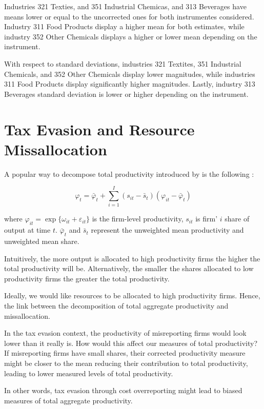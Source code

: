 \documentclass[
  12pt]{article}
\theoremstyle{definition}
\theoremstyle{remark}
\begin{document}
Industries 321 Texties, and 351 Industrial Chemicas, and 313 Beverages
have means lower or equal to the uncorrected ones for both instrumentes
considered. Industry 311 Food Products display a higher mean for both
estimates, while industry 352 Other Chemicals displays a higher or lower
mean depending on the instrument.

With respect to standard deviations, industries 321 Textites, 351
Industrial Chemicals, and 352 Other Chemicals display lower magnitudes,
while industries 311 Food Products display significantly higher
magnitudes. Lastly, industry 313 Beverages standard deviation is lower
or higher depending on the instrument.

\section{Tax Evasion and Resource
Missallocation}\label{tax-evasion-and-resource-missallocation}

A popular way to decompose total productivity introduced by
\citet{Olley1996} is the following :

\[
\varphi_t = \bar\varphi_t + \sum_{i=1}^I \left(s_{it}-\bar s_{t}\right)\left(\varphi_{it}-\bar\varphi_t\right)
\]

where \(\varphi_{it}=\exp\{\omega_{it}+\varepsilon_{it}\}\) is the
firm-level productivity, \(s_{it}\) is firm' \(i\) share of output at
time \(t\). \(\bar\varphi_t\) and \(\bar s_t\) represent the unweighted
mean productivity and unweighted mean share.

Intuitively, the more output is allocated to high productivity firms the
higher the total productivity will be. Alternatively, the smaller the
shares allocated to low productivity firms the greater the total
productivity.

Ideally, we would like resources to be allocated to high productivity
firms. Hence, the link between the decomposition of total aggregate
productivity and missallocation.

In the tax evasion context, the productivity of misreporting firms would
look lower than it really is. How would this affect our measures of
total productivity? If misreporting firms have small shares, their
corrected productivity measure might be closer to the mean reducing
their contribution to total productivity, leading to lower measured
levels of total productivity.

In other words, tax evasion through cost overreporting might lead to
biased measures of total aggregate productivity.
\end{document}
